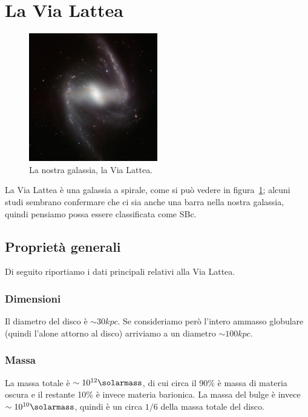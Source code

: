 \section{La Via Lattea}\label{sec:via-lattea}
\begin{figure}
    \centering
    \includegraphics[width = 0.5\textwidth]{immagini/via-lattea.png}
    \caption{La nostra galassia, la Via Lattea.}
    \label{fig:via-lattea}
\end{figure}

La Via Lattea è una galassia a spirale, come si può vedere in figura~\ref{fig:via-lattea}; alcuni studi sembrano confermare che ci sia anche una barra nella nostra galassia, quindi pensiamo possa essere classificata come SBc. 

\subsection{Proprietà generali}
Di seguito riportiamo i dati principali relativi alla Via Lattea.

\subsubsection{Dimensioni}
Il diametro del disco è $\sim 30 kpc$. Se consideriamo però l'intero ammasso globulare (quindi l'alone attorno al disco) arriviamo a un diametro $\sim 100 kpc$.

\subsubsection{Massa}
La massa totale è $\sim 10^{12} \si{\solarmass}$, di cui circa il 90\% è massa di materia oscura e il restante 10\% è invece materia barionica. 
La massa del bulge è invece $\sim 10^{10} \si{\solarmass}$, quindi è un circa $1/6$ della massa totale del disco.

